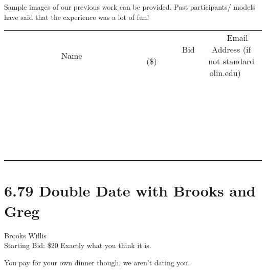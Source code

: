 \documentclass[11pt]{article}
\begin{document}
Sample images of our previous work can be provided. Past participants/ models have said that the experience was a lot of fun!
\\[6ex]
\begin{tabular}{c c c}
~~~~~~~~~~~~~Name~~~~~~~~~~~~~ & ~~~~~~~~~Bid (\$)~~~~~~~~~  & ~~~Email Address (if not standard olin.edu)~~~\\
 & & \\
\hline
 & & \\
\hline
 & & \\
\hline
 & & \\
\hline
 & & \\
\hline
 & & \\
\hline
 & & \\
\hline
 & & \\
\hline
 & & \\
\hline
 & & \\
\hline
 & & \\
\hline
 & & \\
\hline
 & & \\
\hline
 & & \\
\hline
 & & \\
\hline
 & & \\
\hline
 & & \\
\hline
 & & \\
\hline
 & & \\
\hline
 & & \\
\hline
 & & \\
\hline
 & & \\
\hline
 & & \\
\hline
 & & \\
\hline
 & & \\
\hline
 & & \\
\hline
\end{tabular}
\newpage
\section*{6.79 Double Date with Brooks and Greg}
Brooks Willis
\\
Starting Bid: \$20
\newline
Exactly what you think it is. 

You pay for your own dinner though, we aren't dating you. 
\end{document}

